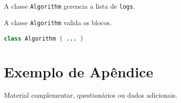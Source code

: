 \documentclass[12pt,oneside]{article}
\newcommand{\code}[1]{\texttt{#1}}
\begin{document}
A classe \code{Algorithm} gerencia a lista de \code{logs}.

A classe \lstinline!Algorithm! valida os blocos.

\begin{lstlisting}[language=Java, caption={Exemplo de classe}, label={lst:ex}]
class Algorithm { ... }
\end{lstlisting}

\printbibliography

\appendix
\renewcommand{\thesection}{Apêndice \Alph{section}}

\section{Exemplo de Apêndice}\label{sec:apendiceA}
Material complementar, questionários ou dados adicionais.
\end{document}

